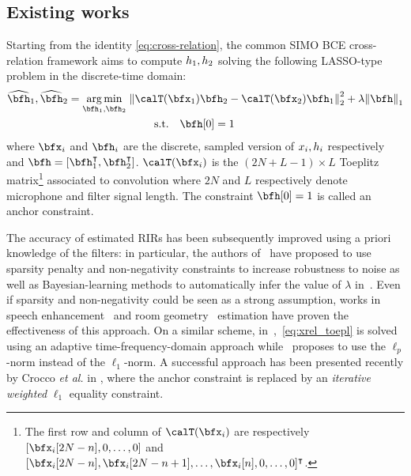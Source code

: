\subsection{Existing works}
Starting from the identity \eqref{eq:cross-relation}, the common SIMO BCE cross-relation framework aims to compute $h_1, h_2$ solving the following LASSO-type problem in the discrete-time domain:
\begin{multline}
    \label{eq:xrel_toepl}
    \disFilterHat_1, \disFilterHat_2
    =
    \kargmin_{\disFilter_1, \disFilter_2}
    \;
    \kvvbar{
        \calT(\disRecordedSignal_1) \disFilter_2
        -
        \calT(\disRecordedSignal_2) \disFilter_1
    }_2^2
    +
    \lambda
    \kvvbar{
        \disFilter
    }_1
    \\
    \text{s.t.} \quad \disFilter[0] = 1
    \qquad
\end{multline}
where $\disRecordedSignal_i$ and $\disFilter_i$ are the discrete, sampled version of $x_i, h_i$ respectively and $\disFilter = [\disFilter_1^\intercal, \disFilter_2^\intercal]$.
$\calT(\disRecordedSignal_i)$ is the $(2N+L-1) \times L$ Toeplitz matrix\footnote{The first row and column of $\calT(\disRecordedSignal_i)$ are respectively $[\disRecordedSignal_i[2N-n], 0,\dotsc,0]$ and $[\disRecordedSignal_i[2N-n], \disRecordedSignal_i[2N-n+1],\dotsc,\disRecordedSignal_i[n], 0,\dotsc, 0]^\intercal$.} associated to convolution where $2N$ and $L$ respectively denote  microphone and filter signal length.
The constraint $\disFilter[0]=1$ is called an anchor constraint.

The accuracy of estimated RIRs has been subsequently improved using a priori knowledge of the filters: in particular, the authors of~\cite{Lin2007} have proposed to use sparsity penalty and non-negativity constraints to increase robustness to noise as well as Bayesian-learning methods to automatically infer the value of $\lambda$ in~\cite{Lin2008}.
Even if sparsity and non-negativity could be seen as a strong assumption, works in speech enhancement~\cite{Ribeiro2010,Dokmanic2015a} and room geometry~\cite{Antonacci2012,Crocco2017} estimation have proven the effectiveness of this approach.
On a similar scheme, in~\cite{Kowalczyk2013},~\eqref{eq:xrel_toepl} is solved using an adaptive time-frequency-domain approach while~\cite{Aissa-El-Bey2008} proposes to use the $\ell_p$-norm instead of the $\ell_1$-norm.
A successful approach has been presented recently by Crocco \textit{et al.} in \cite{Crocco2016}, where the anchor constraint is replaced by an \textit{iterative weighted} $\ell_1$ equality constraint.


